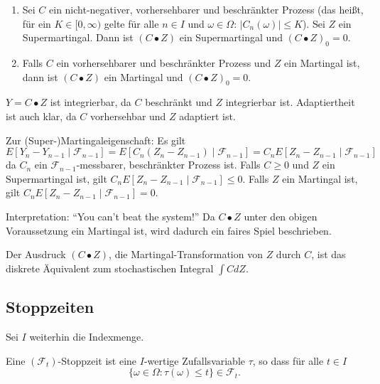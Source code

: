 \documentclass[a4paper,twoside,DIV15,BCOR12mm]{scrbook}
\newcommand{\cF}{\mathcal F}
\newcommand{\dickerkringel}{\bullet}
\begin{document}
\begin{satz}
\begin{enumerate}
\item Sei $C$ ein nicht-negativer, vorhersehbarer und beschränkter Prozess (das heißt, für ein $K\in[0,\infty)$ gelte für alle $n\in I$ und $\omega\in\Omega$: $|C_n(\omega)|\le K$). Sei $Z$ ein Supermartingal. Dann ist $(C\dickerkringel Z)$ ein Supermartingal und $(C\dickerkringel Z)_0=0$.
\item Falls $C$ ein vorhersehbarer und beschränkter Prozess und $Z$ ein Martingal ist, dann ist $(C\dickerkringel Z)$ ein Martingal und $(C\dickerkringel Z)_0=0$.
\end{enumerate}
\end{satz}

\begin{beweis}
$Y=C\dickerkringel Z$ ist integrierbar, da $C$ beschränkt und $Z$ integrierbar ist. Adaptiertheit ist auch klar, da $C$ vorhersehbar und $Z$ adaptiert ist.

Zur (Super-)Martingaleigenschaft: Es gilt
\[
E[Y_n - Y_{n-1}\mid \cF_{n-1}] = E[C_n( Z_n - Z_{n-1})\mid \cF_{n-1}] = C_n E[Z_n - Z_{n-1}\mid \cF_{n-1}]
\]
da $C_n$ ein $\cF_{n-1}$-messbarer, beschränkter Prozess ist. Falls $C\ge 0$ und $Z$ ein Supermartingal ist, gilt $C_n E[Z_n - Z_{n-1}\mid \cF_{n-1}] \le 0$. Falls $Z$ ein Martingal ist, gilt $C_n E[Z_n - Z_{n-1}\mid \cF_{n-1}] = 0$.
\end{beweis}

Interpretation: “You can’t beat the system!” Da $C\bullet Z$ unter den obigen Voraussetzung ein Martingal ist, wird dadurch ein faires Spiel beschrieben. 

\begin{bemerkung}
Der Ausdruck $(C\bullet Z)$, die Martingal-Transformation von $Z$ durch $C$, ist das diskrete Äquivalent zum stochastischen Integral $\int C d Z$.
\end{bemerkung}

\subsection{Stoppzeiten}

Sei $I$ weiterhin die Indexmenge.

\begin{definition}
Eine $(\cF_t)$-Stoppzeit ist eine $I$-wertige Zufallsvariable $\tau$, so dass für alle $t\in I$
\[
\{\omega\in\Omega: \tau(\omega)\le t\}\in\cF_t.
\]
\end{definition}
\end{document}
